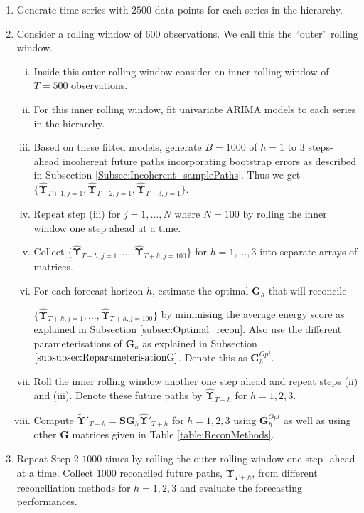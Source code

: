 \documentclass[12pt]{article}
\theoremstyle{definition}
\begin{document}
\begin{enumerate}
	\item Generate time series with $2500$ data points for each series in the hierarchy.
	
	\item Consider a rolling window of $600$ observations. We call this the ``outer'' rolling window.
	\begin{enumerate}[i.]
		\item Inside this outer rolling window consider an inner rolling window of $T=500$ observations.
		\item For this inner rolling window, fit univariate ARIMA models to each series in the hierarchy.
		\item Based on these fitted models, generate $B=1000$ of $h=1$ to $3$ steps-ahead incoherent future paths incorporating bootstrap errors as described in Subsection \ref{Subsec:Incoherent_samplePaths}. Thus we get $\{\hat{\bm{\Upsilon}}_{T+1,j=1}, \hat{\bm{\Upsilon}}_{T+2,j=1}, \hat{\bm{\Upsilon}}_{T+3,j=1}\}$.
		\item Repeat step (iii) for $j=1,\dots,N$ where $N=100$ by rolling the inner window one step ahead at a time.
		\item Collect $\{\hat{\bm{\Upsilon}}_{T+h,j=1},\dots,\hat{\bm{\Upsilon}}_{T+h,j=100}\}$ for $h=1,\dots,3$ into separate arrays of matrices.
		\item For each forecast horizon $h$, estimate the optimal $\bm{G}_h$ that will reconcile
		
		$\{\hat{\bm{\Upsilon}}_{T+h,j=1},\dots,\hat{\bm{\Upsilon}}_{T+h,j=100}\}$ by minimising the average energy score as explained in Subsection \ref{subsec:Optimal_recon}. Also use the different parameterisations of $\bm{G}_h$ as explained in Subsection $\ref{subsubsec:ReparameterisationG}$. Denote this as $\bm{G}^{Opt}_h$.
		\item Roll the inner rolling window another one step ahead and repeat steps (ii) and (iii). Denote these future paths by $\hat{\bm{\Upsilon}}_{T+h}$ for $h=1,2,3$.
		\item Compute $\tilde{\bm{\Upsilon}}'_{T+h} = \bm{SG}_h\hat{\bm{\Upsilon}}'_{T+h}$ for $h=1,2,3$ using $\bm{G}^{Opt}_h$ as well as using other $\bm{G}$ matrices given in Table \ref{table:ReconMethods}.
		
	\end{enumerate}
	
	\item Repeat Step 2 $1000$ times by rolling the outer rolling window one step- ahead at a time. Collect $1000$ reconciled future paths, $\tilde{\bm{\Upsilon}}_{T+h}$, from different reconciliation methods for $h=1,2,3$ and evaluate the forecasting performances.
\end{enumerate}
\end{document}
